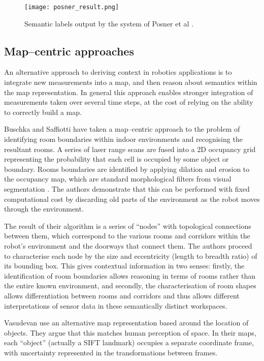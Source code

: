 \begin{figure}[htp]
\centering
\texttt{[image: posner\_result.png]}
\caption{Semantic labels output by the system of Posner et al
  \cite{Posner08}.}
\label{fig:posner-result}
\end{figure}

\subsection{Map--centric approaches}
An alternative approach to deriving context in robotics applications is
to integrate new measurements into a map, and then reason about
semantics within the map representation. In general this approach
enables stronger integration of measurements taken over several time
steps, at the cost of relying on the ability to correctly build a map.

Buschka and Saffiotti \cite{Buschka02} have taken a map--centric
approach to the problem of identifying room boundaries within indoor
environments and recognising the resultant rooms. A series of laser
range scans are fused into a 2D occupancy grid representing the
probability that each cell is occupied by some object or
boundary. Rooms boundaries are identified by applying dilation and
erosion to the occupancy map, which are standard morphological filters
from visual segmentation \cite{Forsyth02}. The
authors demonstrate that this can be performed with fixed
computational cost by discarding old parts of the environment as the
robot moves through the environment.

The result of their algorithm is a series of ``nodes'' with topological
connections between them, which correspond to the various rooms and
corridors within the robot's environment and the doorways that connect
them. The authors proceed to characterise each node by the size and
eccentricity (length to breadth ratio) of its bounding box. This gives
contextual information in two senses: firstly, the identification of
room boundaries allows reasoning in terms of rooms rather than the
entire known environment, and secondly, the characterisation of room
shapes allows differentiation between rooms and corridors and thus
allows different interpretations of sensor data in these semantically
distinct workspaces.

Vasudevan \etal \cite{Vasudevan07} use an alternative map representation
based around the location of objects. They argue that this matches
human perception of space. In their maps, each ``object'' (actually a
SIFT landmark) occupies a separate coordinate frame, with uncertainty
represented in the transformations between frames.

